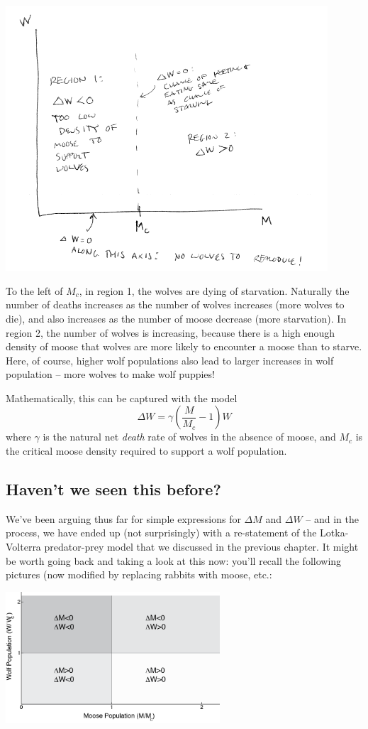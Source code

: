\includegraphics[width=12cm]{figs/DeltaWPhasePlane}

To the left of $M_c$, in region 1, the wolves are dying of starvation.  Naturally the number of deaths increases as the number of wolves increases (more wolves to die), and also increases as the number of moose decrease (more starvation).  In region 2, the number of wolves is increasing, because there is a high enough density of moose that wolves are more likely to encounter a moose than to starve.  Here, of course, higher wolf populations also lead to larger increases in wolf population -- more wolves to make wolf puppies!

Mathematically, this can be captured with the model
$$\Delta W = \gamma(\frac{M}{M_c}-1)W$$
where $\gamma$ is the natural net {\it death} rate of wolves in the absence of moose, and $M_c$ is the critical moose density required to support a wolf population.

\subsection{Haven't we seen this before?}

We've been arguing thus far for simple expressions for $\Delta M$ and $\Delta W$ -- and in the process, we have ended up (not surprisingly) with a re-statement of the Lotka-Volterra predator-prey model that we discussed in the previous chapter.   It might be worth going back and taking a look at this now:  you'll recall the following pictures (now modified by replacing rabbits with moose, etc.:

\beforefig
\centerline{\includegraphics[width=8cm]{figs/WolfMoosePhasePlaneRegions}}
\afterfig

